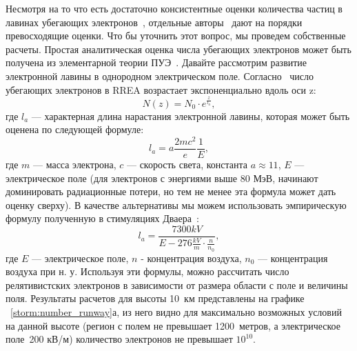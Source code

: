 Несмотря на то что есть достаточно консистентные оценки количества частиц в лавинах убегающих электронов~\cite{moss2006, DwyerSmith2005, skeltved2014, Gurevich2001ufn, Dwyer2012}, отдельные авторы~\cite{Oreshkin_2018} дают на порядки превосходящие оценки. Что бы уточнить этот вопрос, мы проведем собственные расчеты. Простая аналитическая оценка числа убегающих электронов может быть получена из элементарной теории ПУЭ~\cite{Gurevich2001ufn}. Давайте рассмотрим развитие электронной лавины в однородном электрическом поле. Согласно~\cite{Gurevich2001ufn} число убегающих электронов в RREA возрастает экспоненциально вдоль оси z:
\begin{equation}
\label{storm:exp}
N(z) = N_0 \cdot e^{\frac{z}{l_a}},
\end{equation}
где $l_a$ --- характерная длина нарастания электронной лавины, которая может быть оценена по следующей формуле:
\begin{equation}
l_a = a\frac{2 m c^{2}}{e} \frac{1}{E},
\end{equation}
где $m$ --- масса электрона, $c$ --- скорость света, константа $a \approx 11$, $E$ --- электрическое поле (для электронов с энергиями выше 80 МэВ, начинают доминировать радиационные потери, но тем не менее эта формула может дать оценку сверху). В качестве альтернативы мы можем использовать эмпирическую формулу полученную в стимуляциях Дваера~\cite{Dwyer2007}:
\begin{equation}
\label{storm:dwyer}
l_a = \frac{7300 kV}{E - 276 \frac{kV}{m} \cdot \frac{n}{n_0}},
\end{equation}
где $E$ --- электрическое поле, $n$ - концентрация воздуха, $n_0$ --- концентрация воздуха при н. у. Используя эти формулы, можно рассчитать число релятивистских электронов в зависимости от размера области с поле и величины поля. Результаты расчетов для высоты 10~км представлены на графике ~\ref{storm:number_runway}а, из него видно для максимально возможных условий на данной высоте (регион с полем не превышает 1200~метров, а электрическое поле~200 кВ/м) количество электронов не превышает $10^{10}$.

